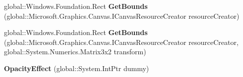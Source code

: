 \begin{DoxyCompactItemize}
\mbox{\label{class_microsoft_1_1_graphics_1_1_canvas_1_1_effects_1_1_opacity_effect_a8bf0901a94b4839c766e269bfa8a8549}} 
global\+::\+Windows.\+Foundation.\+Rect {\bfseries Get\+Bounds} (global\+::\+Microsoft.\+Graphics.\+Canvas.\+I\+Canvas\+Resource\+Creator resource\+Creator)
\item 
\mbox{\label{class_microsoft_1_1_graphics_1_1_canvas_1_1_effects_1_1_opacity_effect_ae3afb2721cc2938d2730bfcfdab779d2}} 
global\+::\+Windows.\+Foundation.\+Rect {\bfseries Get\+Bounds} (global\+::\+Microsoft.\+Graphics.\+Canvas.\+I\+Canvas\+Resource\+Creator resource\+Creator, global\+::\+System.\+Numerics.\+Matrix3x2 transform)
\item 
\mbox{\label{class_microsoft_1_1_graphics_1_1_canvas_1_1_effects_1_1_opacity_effect_a637fb4e2ccc14281dc718c4623e0343c}} 
{\bfseries Opacity\+Effect} (global\+::\+System.\+Int\+Ptr dummy)
\end{DoxyCompactItemize}
